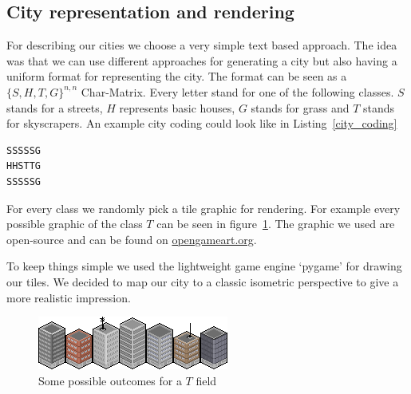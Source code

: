 \documentclass{scrartcl}
\begin{document}
\subsection{City representation and rendering}

For describing our cities we choose a very simple text based approach. The
idea was that we can use different approaches for generating a city but
also having a uniform format for representing the city.
The format can be seen as a $\lbrace S,H,T,G \rbrace^{n,n}$ Char-Matrix.
Every letter stand for one of the following classes.
$S$ stands for a streets, $H$ represents basic houses, $G$ stands for grass 
and $T$ stands for skyscrapers.
An example city coding could look like in Listing~\ref{city_coding}
\begin{lstlisting}[float,frame=lines,caption=Example city coding, label=city_coding]
SSSSSG
HHSTTG
SSSSSG
\end{lstlisting}

For every class we randomly pick a tile graphic for rendering. For example every possible
graphic of the class $T$ can be seen in figure~\ref{fig:tower_tiles}.
The graphic we used are open-source and can be found on
\href{https://opengameart.org}{opengameart.org}.

To keep things simple we used the lightweight game engine `pygame' for drawing
our tiles. We decided to map our city to a classic isometric perspective to
give a more realistic impression.

\begin{figure}
    \centering
    \includegraphics[scale = 4]{tower_tiles}
    \caption{Some possible outcomes for a $T$ field}
    \label{fig:tower_tiles}
\end{figure}
\end{document}
